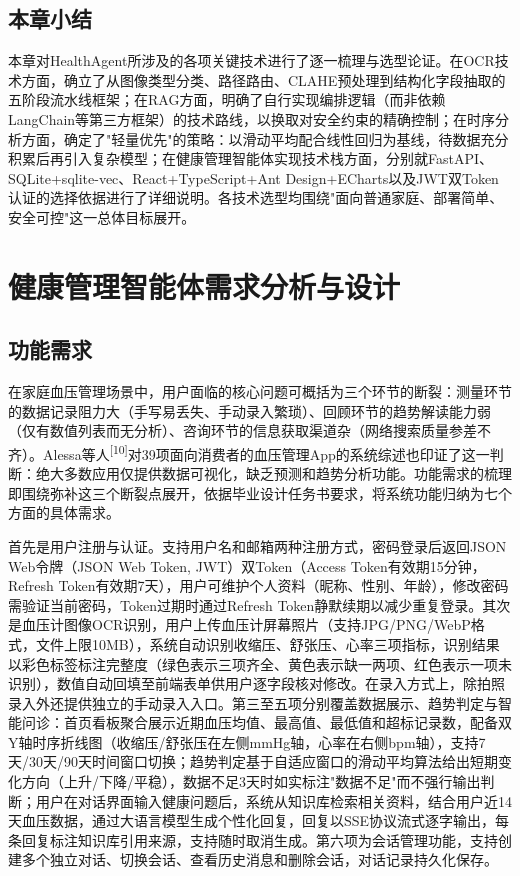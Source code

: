 \documentclass[zihao=-4,a4paper]{ctexart}
\numberwithin{figure}{section}
\numberwithin{table}{section}
\begin{document}
\subsection{本章小结}

本章对HealthAgent所涉及的各项关键技术进行了逐一梳理与选型论证。在OCR技术方面，确立了从图像类型分类、路径路由、CLAHE预处理到结构化字段抽取的五阶段流水线框架；在RAG方面，明确了自行实现编排逻辑（而非依赖LangChain等第三方框架）的技术路线，以换取对安全约束的精确控制；在时序分析方面，确定了"轻量优先"的策略：以滑动平均配合线性回归为基线，待数据充分积累后再引入复杂模型；在健康管理智能体实现技术栈方面，分别就FastAPI、SQLite+sqlite-vec、React+TypeScript+Ant Design+ECharts以及JWT双Token认证的选择依据进行了详细说明。各技术选型均围绕"面向普通家庭、部署简单、安全可控"这一总体目标展开。

\newpage
\section{健康管理智能体需求分析与设计}

\subsection{功能需求}

在家庭血压管理场景中，用户面临的核心问题可概括为三个环节的断裂：测量环节的数据记录阻力大（手写易丢失、手动录入繁琐）、回顾环节的趋势解读能力弱（仅有数值列表而无分析）、咨询环节的信息获取渠道杂（网络搜索质量参差不齐）。Alessa等人\textsuperscript{[10]}对39项面向消费者的血压管理App的系统综述也印证了这一判断：绝大多数应用仅提供数据可视化，缺乏预测和趋势分析功能。功能需求的梳理即围绕弥补这三个断裂点展开，依据毕业设计任务书要求，将系统功能归纳为七个方面的具体需求。

首先是用户注册与认证。支持用户名和邮箱两种注册方式，密码登录后返回JSON Web令牌（JSON Web Token, JWT）双Token（Access Token有效期15分钟，Refresh Token有效期7天），用户可维护个人资料（昵称、性别、年龄），修改密码需验证当前密码，Token过期时通过Refresh Token静默续期以减少重复登录。其次是血压计图像OCR识别，用户上传血压计屏幕照片（支持JPG/PNG/WebP格式，文件上限10MB），系统自动识别收缩压、舒张压、心率三项指标，识别结果以彩色标签标注完整度（绿色表示三项齐全、黄色表示缺一两项、红色表示一项未识别），数值自动回填至前端表单供用户逐字段核对修改。在录入方式上，除拍照录入外还提供独立的手动录入入口。第三至五项分别覆盖数据展示、趋势判定与智能问诊：首页看板聚合展示近期血压均值、最高值、最低值和超标记录数，配备双Y轴时序折线图（收缩压/舒张压在左侧mmHg轴，心率在右侧bpm轴），支持7天/30天/90天时间窗口切换；趋势判定基于自适应窗口的滑动平均算法给出短期变化方向（上升/下降/平稳），数据不足3天时如实标注"数据不足"而不强行输出判断；用户在对话界面输入健康问题后，系统从知识库检索相关资料，结合用户近14天血压数据，通过大语言模型生成个性化回复，回复以SSE协议流式逐字输出，每条回复标注知识库引用来源，支持随时取消生成。第六项为会话管理功能，支持创建多个独立对话、切换会话、查看历史消息和删除会话，对话记录持久化保存。
\end{document}

